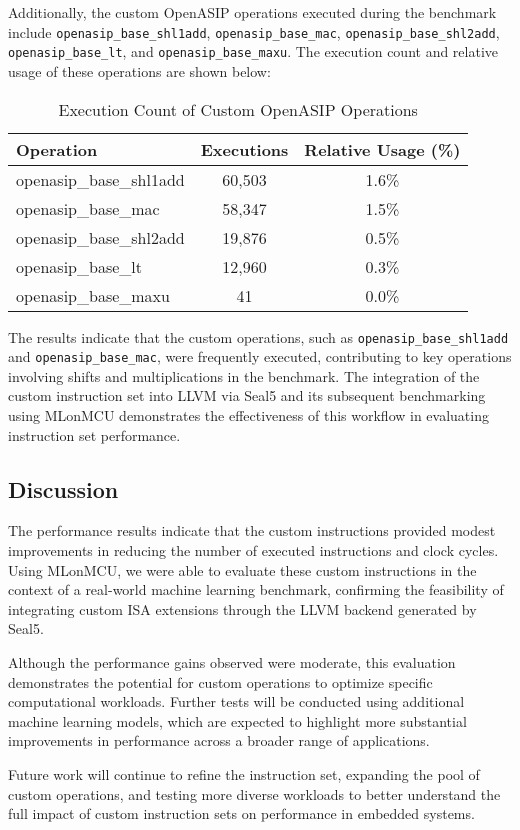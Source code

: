 Additionally, the custom OpenASIP operations executed during the benchmark include \texttt{openasip\_base\_shl1add}, \texttt{openasip\_base\_mac}, \texttt{openasip\_base\_shl2add}, \texttt{openasip\_base\_lt}, and \texttt{openasip\_base\_maxu}. The execution count and relative usage of these operations are shown below:

\begin{table}[h!]
    \centering
    \begin{tabular}{|l|c|c|}
        \hline
        \textbf{Operation} & \textbf{Executions} & \textbf{Relative Usage (\%)} \\
        \hline
        openasip\_base\_shl1add & 60,503 & 1.6\% \\
        openasip\_base\_mac     & 58,347 & 1.5\% \\
        openasip\_base\_shl2add & 19,876 & 0.5\% \\
        openasip\_base\_lt      & 12,960 & 0.3\% \\
        openasip\_base\_maxu    & 41     & 0.0\% \\
        \hline
    \end{tabular}
    \caption{Execution Count of Custom OpenASIP Operations}
\end{table}

The results indicate that the custom operations, such as \texttt{openasip\_base\_shl1add} and \texttt{openasip\_base\_mac}, were frequently executed, contributing to key operations involving shifts and multiplications in the benchmark. The integration of the custom instruction set into LLVM via Seal5 and its subsequent benchmarking using MLonMCU demonstrates the effectiveness of this workflow in evaluating instruction set performance.

\subsection{Discussion}

The performance results indicate that the custom instructions provided modest improvements in reducing the number of executed instructions and clock cycles. Using MLonMCU, we were able to evaluate these custom instructions in the context of a real-world machine learning benchmark, confirming the feasibility of integrating custom ISA extensions through the LLVM backend generated by Seal5.

Although the performance gains observed were moderate, this evaluation demonstrates the potential for custom operations to optimize specific computational workloads. Further tests will be conducted using additional machine learning models, which are expected to highlight more substantial improvements in performance across a broader range of applications.

Future work will continue to refine the instruction set, expanding the pool of custom operations, and testing more diverse workloads to better understand the full impact of custom instruction sets on performance in embedded systems.
